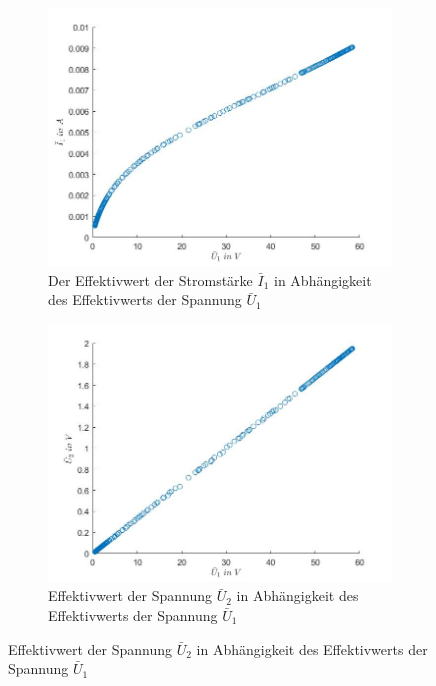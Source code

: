 \documentclass[a4paper, 12pt,]{scrartcl}
\begin{document}
\begin{figure}[H]\centering
\begin{adjustwidth}{-1em}{7em}
  \begin{subfigure}[b]{0.5\textwidth}
    \includegraphics[width=\textwidth]{U1I11}
    \caption{Der Effektivwert der Stromstärke $\bar{I}_1$ in Abhängigkeit des Effektivwerts der Spannung $\bar{U}_1$}
    \label{fig:}
  \end{subfigure}
  \begin{subfigure}[b]{0.5\textwidth}
    \includegraphics[width=\textwidth]{U1U21}
    \caption{Effektivwert der Spannung $\bar{U}_2$ in Abhängigkeit des  Effektivwerts der Spannung $\bar{U}_1$}
    \label{fig:}
  \end{subfigure}

\end{adjustwidth}
\end{figure}
\end{document}
